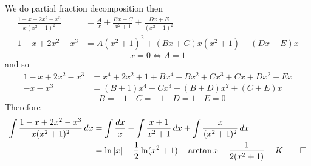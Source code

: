 \begin{solution}
    We do partial fraction decomposition then
    \begin{align*}
        \frac{1-x+2x^2-x^3}{x(x^2+1)^2}
        &= \frac{A}{x}+\frac{Bx+C}{x^2+1}+\frac{Dx+E}{(x^2+1)^2} \\
        1-x+2x^2-x^3 &= A(x^2+1)^2+(Bx+C)x(x^2+1)+(Dx+E)x
    \end{align*}
    \[x=0\iff A=1\]
    and so
    \begin{align*}
        1-x+2x^2-x^3 &= x^4+2x^2+1+Bx^4+Bx^2+Cx^3+Cx+Dx^2+Ex \\
        -x-x^3 &= (B+1)x^4+Cx^3+(B+D)x^2+(C+E)x
    \end{align*}
    \[\quad B=-1\quad C=-1\quad D=1\quad E=0\]
    Therefore
    \begin{align*}
        \int\frac{1-x+2x^2-x^3}{x(x^2+1)^2}\,dx
        &= \int\frac{dx}{x}-\int\frac{x+1}{x^2+1}\,dx
        +\int\frac{x}{(x^2+1)^2}\,dx \\
        &= \ln|x|-\frac{1}{2}\ln(x^2+1)-\arctan x
        -\frac{1}{2(x^2+1)}+K \qedhere
    \end{align*}
\end{solution}